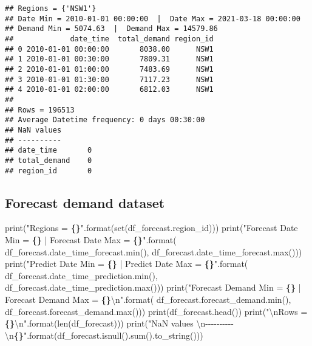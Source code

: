 \documentclass[mstat,12pt,a4paper]{unswthesis}
\newenvironment{Shaded}{\begin{snugshade}}{\end{snugshade}}
\newcommand{\BuiltInTok}[1]{#1}
\newcommand{\CharTok}[1]{\textcolor[rgb]{0.31,0.60,0.02}{#1}}
\newcommand{\NormalTok}[1]{#1}
\newcommand{\SpecialCharTok}[1]{\textcolor[rgb]{0.81,0.36,0.00}{\textbf{#1}}}
\newcommand{\StringTok}[1]{\textcolor[rgb]{0.31,0.60,0.02}{#1}}
\begin{document}
\begin{verbatim}
## Regions = {'NSW1'}
## Date Min = 2010-01-01 00:00:00  |  Date Max = 2021-03-18 00:00:00
## Demand Min = 5074.63  |  Demand Max = 14579.86
##             date_time  total_demand region_id
## 0 2010-01-01 00:00:00       8038.00      NSW1
## 1 2010-01-01 00:30:00       7809.31      NSW1
## 2 2010-01-01 01:00:00       7483.69      NSW1
## 3 2010-01-01 01:30:00       7117.23      NSW1
## 4 2010-01-01 02:00:00       6812.03      NSW1
## 
## Rows = 196513
## Average Datetime frequency: 0 days 00:30:00
## NaN values 
## ----------
## date_time       0
## total_demand    0
## region_id       0
\end{verbatim}

\bigskip

\subsection{Forecast demand dataset}\label{forecast-demand-dataset}

\begin{Shaded}
\begin{Highlighting}[]
\BuiltInTok{print}\NormalTok{(}\StringTok{"Regions = }\SpecialCharTok{\{\}}\StringTok{"}\NormalTok{.}\BuiltInTok{format}\NormalTok{(}\BuiltInTok{set}\NormalTok{(df\_forecast.region\_id)))}
\BuiltInTok{print}\NormalTok{(}\StringTok{"Forecast Date Min = }\SpecialCharTok{\{\}}\StringTok{ | Forecast Date Max = }\SpecialCharTok{\{\}}\StringTok{"}\NormalTok{.}\BuiltInTok{format}\NormalTok{(}
\NormalTok{    df\_forecast.date\_time\_forecast.}\BuiltInTok{min}\NormalTok{(), df\_forecast.date\_time\_forecast.}\BuiltInTok{max}\NormalTok{()))}
\BuiltInTok{print}\NormalTok{(}\StringTok{"Predict Date Min = }\SpecialCharTok{\{\}}\StringTok{ | Predict Date Max = }\SpecialCharTok{\{\}}\StringTok{"}\NormalTok{.}\BuiltInTok{format}\NormalTok{(}
\NormalTok{    df\_forecast.date\_time\_prediction.}\BuiltInTok{min}\NormalTok{(), }
\NormalTok{    df\_forecast.date\_time\_prediction.}\BuiltInTok{max}\NormalTok{()))}
\BuiltInTok{print}\NormalTok{(}\StringTok{"Forecast Demand Min = }\SpecialCharTok{\{\}}\StringTok{ | Forecast Demand Max = }\SpecialCharTok{\{\}}\CharTok{\textbackslash{}n}\StringTok{"}\NormalTok{.}\BuiltInTok{format}\NormalTok{(}
\NormalTok{    df\_forecast.forecast\_demand.}\BuiltInTok{min}\NormalTok{(), df\_forecast.forecast\_demand.}\BuiltInTok{max}\NormalTok{()))}
\BuiltInTok{print}\NormalTok{(df\_forecast.head())}
\BuiltInTok{print}\NormalTok{(}\StringTok{"}\CharTok{\textbackslash{}n}\StringTok{Rows = }\SpecialCharTok{\{\}}\CharTok{\textbackslash{}n}\StringTok{"}\NormalTok{.}\BuiltInTok{format}\NormalTok{(}\BuiltInTok{len}\NormalTok{(df\_forecast)))}
\BuiltInTok{print}\NormalTok{(}\StringTok{"NaN values }\CharTok{\textbackslash{}n}\StringTok{{-}{-}{-}{-}{-}{-}{-}{-}{-}{-}}\CharTok{\textbackslash{}n}\SpecialCharTok{\{\}}\StringTok{"}\NormalTok{.}\BuiltInTok{format}\NormalTok{(df\_forecast.isnull().}\BuiltInTok{sum}\NormalTok{().to\_string()))}
\end{Highlighting}
\end{Shaded}
\end{document}
